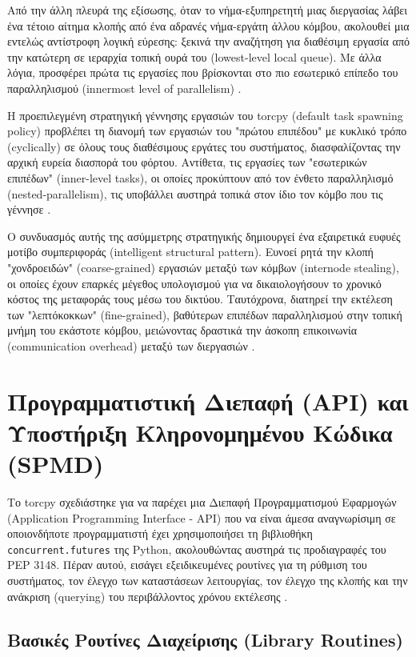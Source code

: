 Από την άλλη πλευρά της εξίσωσης, όταν το νήμα-εξυπηρετητή μιας διεργασίας λάβει ένα τέτοιο αίτημα κλοπής από ένα αδρανές νήμα-εργάτη άλλου κόμβου, ακολουθεί μια εντελώς αντίστροφη λογική εύρεσης: ξεκινά την αναζήτηση για διαθέσιμη εργασία από την κατώτερη σε ιεραρχία τοπική ουρά του (lowest-level local queue). Με άλλα λόγια, προσφέρει πρώτα τις εργασίες που βρίσκονται στο πιο εσωτερικό επίπεδο του παραλληλισμού (innermost level of parallelism) \cite{hadjidoukas2020torcpy}.

Η προεπιλεγμένη στρατηγική γέννησης εργασιών του torcpy (default task spawning policy) προβλέπει τη διανομή των εργασιών του "πρώτου επιπέδου" με κυκλικό τρόπο (cyclically) σε όλους τους διαθέσιμους εργάτες του συστήματος, διασφαλίζοντας την αρχική ευρεία διασπορά του φόρτου. Αντίθετα, τις εργασίες των "εσωτερικών επιπέδων" (inner-level tasks), οι οποίες προκύπτουν από τον ένθετο παραλληλισμό (nested-parallelism), τις υποβάλλει αυστηρά τοπικά στον ίδιο τον κόμβο που τις γέννησε \cite{hadjidoukas2020torcpy}.

Ο συνδυασμός αυτής της ασύμμετρης στρατηγικής δημιουργεί ένα εξαιρετικά ευφυές μοτίβο συμπεριφοράς (intelligent structural pattern). Ευνοεί ρητά την κλοπή "χονδροειδών" (coarse-grained) εργασιών μεταξύ των κόμβων (internode stealing), οι οποίες έχουν επαρκές μέγεθος υπολογισμού για να δικαιολογήσουν το χρονικό κόστος της μεταφοράς τους μέσω του δικτύου. Ταυτόχρονα, διατηρεί την εκτέλεση των "λεπτόκοκκων" (fine-grained), βαθύτερων επιπέδων παραλληλισμού στην τοπική μνήμη του εκάστοτε κόμβου, μειώνοντας δραστικά την άσκοπη επικοινωνία (communication overhead) μεταξύ των διεργασιών \cite{hadjidoukas2020torcpy}.

\section{Προγραμματιστική Διεπαφή (API) και Υποστήριξη Κληρονομημένου Κώδικα (SPMD)}

Το torcpy σχεδιάστηκε για να παρέχει μια Διεπαφή Προγραμματισμού Εφαρμογών (Application Programming Interface - API) που να είναι άμεσα αναγνωρίσιμη σε οποιονδήποτε προγραμματιστή έχει χρησιμοποιήσει τη βιβλιοθήκη \texttt{concurrent.futures} της Python, ακολουθώντας αυστηρά τις προδιαγραφές του PEP 3148. Πέραν αυτού, εισάγει εξειδικευμένες ρουτίνες για τη ρύθμιση του συστήματος, τον έλεγχο των καταστάσεων λειτουργίας, τον έλεγχο της κλοπής και την ανάκριση (querying) του περιβάλλοντος χρόνου εκτέλεσης \cite{hadjidoukas2020torcpy}.

\subsection{Βασικές Ρουτίνες Διαχείρισης (Library Routines)}

